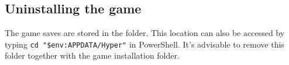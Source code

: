 \subsection{Uninstalling the game}
The game saves are stored in the  folder.
This location can also be accessed by typing \texttt{cd "\$env:APPDATA/Hyper"} in PowerShell.
It's advisable to remove this folder together with the game installation folder.